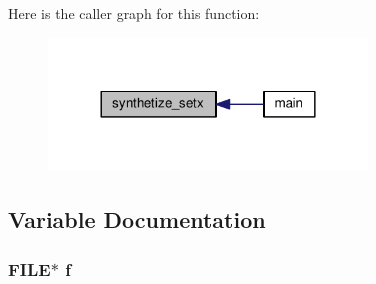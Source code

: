 Here is the caller graph for this function\+:
\nopagebreak
\begin{figure}[H]
\begin{center}
\leavevmode
\includegraphics[width=240pt]{sparc64-setx_8c_a3398214a4ab7a354bb57e5e715c4ba12_icgraph}
\end{center}
\end{figure}




\subsection{Variable Documentation}
\subsubsection[{\texorpdfstring{f}{f}}]{\setlength{\rightskip}{0pt plus 5cm}F\+I\+LE$\ast$ f}\hypertarget{sparc64-setx_8c_a3efb0e1a16208deecbd84c15401f7cf8}{}\label{sparc64-setx_8c_a3efb0e1a16208deecbd84c15401f7cf8}
